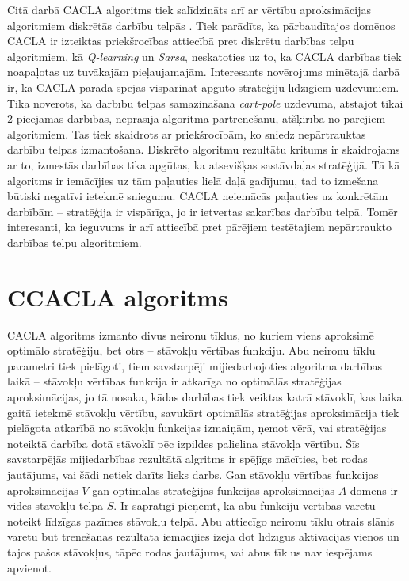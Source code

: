 \documentclass{ludis} %
\begin{document}
Citā darbā CACLA algoritms tiek salīdzināts arī ar vērtību aproksimācijas
algoritmiem diskrētās darbību telpās \autocite{Hasselt2009}. Tiek parādīts, ka
pārbaudītajos domēnos CACLA ir izteiktas priekšrocības attiecībā pret diskrētu
darbības telpu algoritmiem, kā \textit{Q-learning} un \textit{Sarsa},
neskatoties uz to, ka CACLA darbības tiek noapaļotas uz tuvākajām pieļaujamajām.
Interesants novērojums minētajā darbā ir, ka CACLA parāda spējas vispārināt
apgūto stratēģiju līdzīgiem uzdevumiem. Tika novērots, ka darbību telpas
samazināšana \textit{cart-pole} uzdevumā, atstājot tikai 2 pieejamās darbības,
neprasīja algoritma pārtrenēšanu, atšķirībā no pārējiem algoritmiem. Tas tiek
skaidrots ar priekšrocībām, ko sniedz nepārtrauktas darbību telpas izmantošana.
Diskrēto algoritmu rezultātu kritums ir skaidrojams ar to, izmestās darbības
tika apgūtas, ka atsevišķas sastāvdaļas stratēģijā. Tā kā algoritms ir
iemācījies uz tām paļauties lielā daļā gadījumu, tad to izmešana būtiski
negatīvi ietekmē sniegumu. CACLA neiemācās paļauties uz konkrētām darbībām --
stratēģija ir vispārīga, jo ir ietvertas sakarības darbību telpā. Tomēr
interesanti, ka ieguvums ir arī attiecībā pret pārējiem testētajiem nepārtraukto
darbības telpu algoritmiem.

\chapter{CCACLA algoritms}\label{chap:ccacla}
CACLA algoritms izmanto divus neironu tīklus, no kuriem viens aproksimē optimālo
stratēģiju, bet otrs -- stāvokļu vērtības funkciju. Abu neironu tīklu parametri
tiek pielāgoti, tiem savstarpēji mijiedarbojoties algoritma darbības laikā --
stāvokļu vērtības funkcija ir atkarīga no optimālās stratēģijas aproksimācijas,
jo tā nosaka, kādas darbības tiek veiktas katrā stāvoklī, kas laika gaitā
ietekmē stāvokļu vērtību, savukārt optimālās stratēģijas aproksimācija tiek
pielāgota atkarībā no stāvokļu funkcijas izmaiņām, ņemot vērā, vai stratēģijas
noteiktā darbība dotā stāvoklī pēc izpildes palielina stāvokļa vērtību. Šīs
savstarpējās mijiedarbības rezultātā algritms ir spējīgs mācīties, bet rodas
jautājums, vai šādi netiek darīts lieks darbs. Gan stāvokļu vērtības funkcijas
aproksimācijas $V$ gan optimālās stratēģijas funkcijas aproksimācijas $A$ domēns
ir vides stāvokļu telpa $S$. Ir saprātīgi pieņemt, ka abu funkciju vērtības
varētu noteikt līdzīgas pazīmes stāvokļu telpā. Abu attiecīgo neironu tīklu
otrais slānis varētu būt trenēšānas rezultātā iemācījies izejā dot līdzīgus
aktivācijas vienos un tajos pašos stāvokļus, tāpēc rodas jautājums, vai abus
tīklus nav iespējams apvienot.
\end{document}
